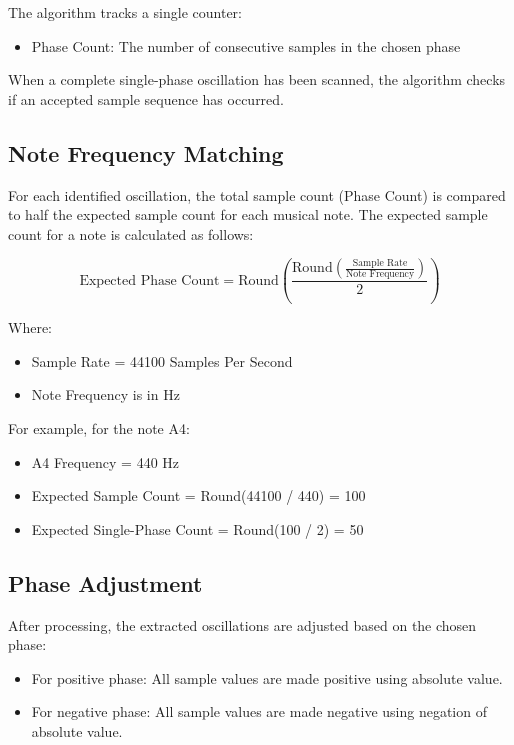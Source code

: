 \documentclass[12pt,a4paper]{article}
\begin{document}
The algorithm tracks a single counter:
\begin{itemize}
    \item Phase Count: The number of consecutive samples in the chosen phase
\end{itemize}

When a complete single-phase oscillation has been scanned, the algorithm checks if an accepted sample sequence has occurred.

\subsection{Note Frequency Matching}
For each identified oscillation, the total sample count (Phase Count) is compared to half the expected sample count for each musical note. The expected sample count for a note is calculated as follows:

\begin{equation*}
    \text{Expected Phase Count} = \text{Round}\left(\frac{\text{Round}(\frac{\text{Sample Rate}}{\text{Note Frequency}})}{2}\right)
\end{equation*}

Where:
\begin{itemize}
    \item Sample Rate = 44100 Samples Per Second
    \item Note Frequency is in Hz
\end{itemize}

For example, for the note A4:
\begin{itemize}
    \item A4 Frequency = 440 Hz
    \item Expected Sample Count = Round(44100 / 440) = 100
    \item Expected Single-Phase Count = Round(100 / 2) = 50
\end{itemize}

\subsection{Phase Adjustment}
After processing, the extracted oscillations are adjusted based on the chosen phase:
\begin{itemize}
    \item For positive phase: All sample values are made positive using absolute value.
    \item For negative phase: All sample values are made negative using negation of absolute value.
\end{itemize}
\end{document}
